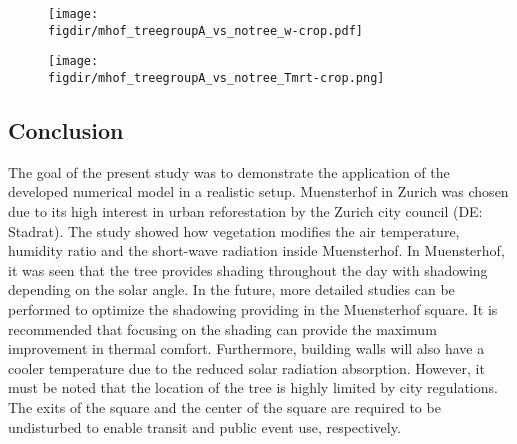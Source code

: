 	\begin{figure}[p]
		\centering
		\texttt{[image: \\figdir/mhof\_treegroupA\_vs\_notree\_w-crop.pdf]}
		\caption{}
		\label{fig:mwdiff_muensterhof}
	\end{figure}

		
	\begin{figure}[p]
		\centering
		\texttt{[image: \\figdir/mhof\_treegroupA\_vs\_notree\_Tmrt-crop.png]}
		\caption{}
		\label{fig:mTmrtdiff_muensterhof}
	\end{figure}


\subsection{Conclusion}

The goal of the present study was to demonstrate the application of the developed numerical model in a realistic setup. Muensterhof in Zurich was chosen due to its high interest in urban reforestation by the Zurich city council (DE: Stadrat). The study showed how vegetation modifies the air temperature, humidity ratio and the short-wave radiation inside Muensterhof. In Muensterhof, it was seen that the tree provides shading throughout the day with shadowing depending on the solar angle. In the future, more detailed studies can be performed to optimize the shadowing providing in the Muensterhof square. It is recommended that focusing on the shading can provide the maximum improvement in thermal comfort. Furthermore, building walls will also have a cooler temperature due to the reduced solar radiation absorption. However, it must be noted that the location of the tree is highly limited by city regulations. The exits of the square and the center of the square are required to be undisturbed to enable transit and public event use, respectively. 

